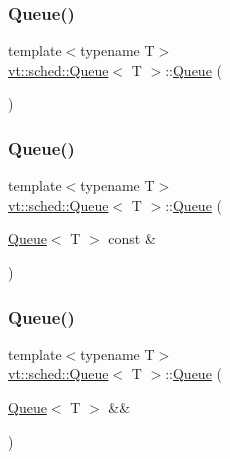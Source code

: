 \subsubsection{\texorpdfstring{Queue()}{Queue()}\hspace{0.1cm}{\footnotesize\ttfamily [1/3]}}
{\footnotesize\ttfamily template$<$typename T$>$ \\
\hyperlink{structvt_1_1sched_1_1_queue}{vt\+::sched\+::\+Queue}$<$ T $>$\+::\hyperlink{structvt_1_1sched_1_1_queue}{Queue} (\begin{DoxyParamCaption}{ }\end{DoxyParamCaption})\hspace{0.3cm}{\ttfamily [default]}}

\mbox{\label{structvt_1_1sched_1_1_queue_a718cecfdd0b3fa8ec80fe4768e153467}} 
\subsubsection{\texorpdfstring{Queue()}{Queue()}\hspace{0.1cm}{\footnotesize\ttfamily [2/3]}}
{\footnotesize\ttfamily template$<$typename T$>$ \\
\hyperlink{structvt_1_1sched_1_1_queue}{vt\+::sched\+::\+Queue}$<$ T $>$\+::\hyperlink{structvt_1_1sched_1_1_queue}{Queue} (\begin{DoxyParamCaption}\item[{\hyperlink{structvt_1_1sched_1_1_queue}{Queue}$<$ T $>$ const \&}]{ }\end{DoxyParamCaption})\hspace{0.3cm}{\ttfamily [default]}}

\mbox{\label{structvt_1_1sched_1_1_queue_a0a85a456ebc179a2f7ab77369566eb5c}} 
\subsubsection{\texorpdfstring{Queue()}{Queue()}\hspace{0.1cm}{\footnotesize\ttfamily [3/3]}}
{\footnotesize\ttfamily template$<$typename T$>$ \\
\hyperlink{structvt_1_1sched_1_1_queue}{vt\+::sched\+::\+Queue}$<$ T $>$\+::\hyperlink{structvt_1_1sched_1_1_queue}{Queue} (\begin{DoxyParamCaption}\item[{\hyperlink{structvt_1_1sched_1_1_queue}{Queue}$<$ T $>$ \&\&}]{ }\end{DoxyParamCaption})\hspace{0.3cm}{\ttfamily [default]}}



